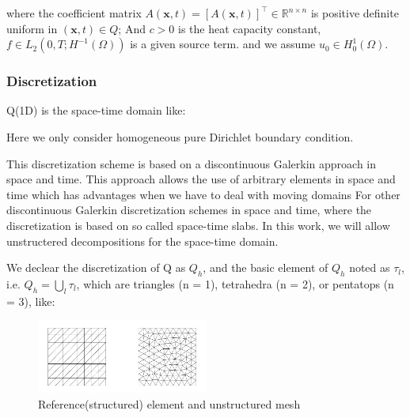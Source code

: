 where the coefficient matrix  $A(\textbf{x}, t)=[A(\textbf{x}, t)]^{\top} \in \mathbb{R}^{n \times n}$  is positive definite uniform in  $(\textbf{x}, t) \in Q $; 
And $c>0$ is the heat capacity constant, $f \in L_{2}\left(0, T ; H^{-1}(\Omega)\right)$  is a given source term.
and we assume  $u_{0} \in H_{0}^{1}(\Omega)$.

\subsubsection*{Discretization}
Q(1D) is the space-time domain like:

\begin{center}
\end{center}

Here we only consider homogeneous pure Dirichlet boundary condition. 

This discretization scheme is based on a discontinuous Galerkin approach in space and time. 
This approach allows the use of arbitrary elements in space and time which has advantages when we have to deal with moving domains
For other discontinuous Galerkin discretization schemes in space and time, where the discretization is based on so called space-time slabs.
In this work, we will allow unstructered decompositions for the space-time domain.

We declear the discretization of Q as $Q_h$, and the basic element of $Q_h$ noted as $\tau_l$, i.e. $Q_h=\bigcup_l \tau_l $, which are triangles (n = 1),
tetrahedra (n = 2), or pentatops (n = 3), like:

\begin{figure}[H]  
    \centering  
    \includegraphics[width=0.5\textwidth]{./pics/final/p2.png}  
    \caption{Reference(structured) element and unstructured mesh}  
\end{figure}  

